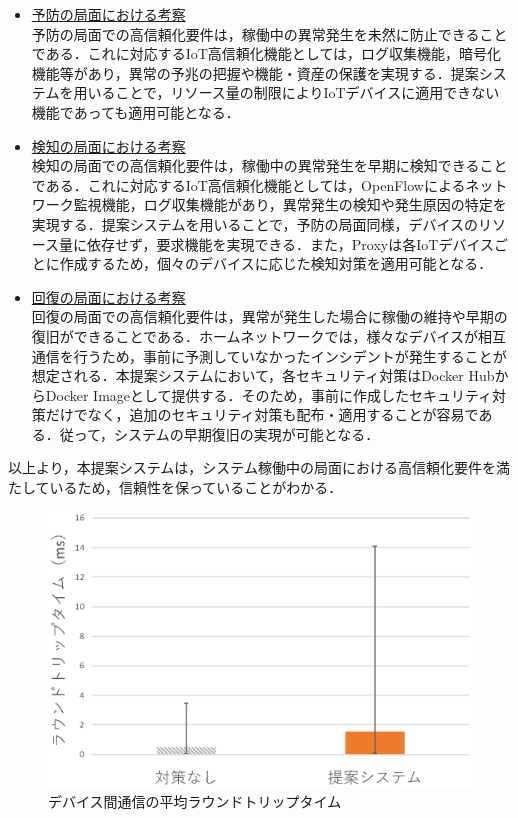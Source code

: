 \documentclass[Japanese]{dicomopapers}
\begin{document}
\begin{itemize}
	\item \underline{予防の局面における考察}\mbox{}\\
	      予防の局面での高信頼化要件は，稼働中の異常発生を未然に防止できることである．これに対応するIoT高信頼化機能としては，ログ収集機能，暗号化機能等があり，異常の予兆の把握や機能・資産の保護を実現する．提案システムを用いることで，リソース量の制限によりIoTデバイスに適用できない機能であっても適用可能となる．
	\item \underline{検知の局面における考察}\mbox{}\\
	      検知の局面での高信頼化要件は，稼働中の異常発生を早期に検知できることである．これに対応するIoT高信頼化機能としては，OpenFlowによるネットワーク監視機能，ログ収集機能があり，異常発生の検知や発生原因の特定を実現する．提案システムを用いることで，予防の局面同様，デバイスのリソース量に依存せず，要求機能を実現できる．また，Proxyは各IoTデバイスごとに作成するため，個々のデバイスに応じた検知対策を適用可能となる．
	\item \underline{回復の局面における考察}\mbox{}\\
	      回復の局面での高信頼化要件は，異常が発生した場合に稼働の維持や早期の復旧ができることである．ホームネットワークでは，様々なデバイスが相互通信を行うため，事前に予測していなかったインシデントが発生することが想定される．本提案システムにおいて，各セキュリティ対策はDocker HubからDocker Imageとして提供する．そのため，事前に作成したセキュリティ対策だけでなく，追加のセキュリティ対策も配布・適用することが容易である．従って，システムの早期復旧の実現が可能となる．
\end{itemize}

以上より，本提案システムは，システム稼働中の局面における高信頼化要件を満たしているため，信頼性を保っていることがわかる．

\begin{figure}[!tb]
	\centering
	\includegraphics[width=\linewidth]{img/result.eps}
	\caption{デバイス間通信の平均ラウンドトリップタイム}
	\label{fig:result2}
\end{figure}
\end{document}
